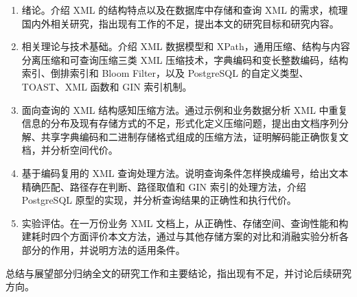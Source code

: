 \begin{enumerate}[label=第\arabic*章]
\item 绪论。介绍 XML 的结构特点以及在数据库中存储和查询 XML 的需求，梳理国内外相关研究，指出现有工作的不足，提出本文的研究目标和研究内容。
\item 相关理论与技术基础。介绍 XML 数据模型和 XPath，通用压缩、结构与内容分离压缩和可查询压缩三类 XML 压缩技术，字典编码和变长整数编码，结构索引、倒排索引和 Bloom Filter，以及 PostgreSQL 的自定义类型、TOAST、XML 函数和 GIN 索引机制。
\item 面向查询的 XML 结构感知压缩方法。通过示例和业务数据分析 XML 中重复信息的分布及现有存储方式的不足，形式化定义压缩问题，提出由文档序列分解、共享字典编码和二进制存储格式组成的压缩方法，证明解码能正确恢复文档，并分析空间代价。
\item 基于编码复用的 XML 查询处理方法。说明查询条件怎样换成编号，给出文本精确匹配、路径存在判断、路径取值和 GIN 索引的处理方法，介绍 PostgreSQL 原型的实现，并分析查询结果的正确性和执行代价。
\item 实验评估。在一万份业务 XML 文档上，从正确性、存储空间、查询性能和构建耗时四个方面评价本文方法，通过与其他存储方案的对比和消融实验分析各部分的作用，并说明方法的适用条件。
\end{enumerate}

总结与展望部分归纳全文的研究工作和主要结论，指出现有不足，并讨论后续研究方向。
